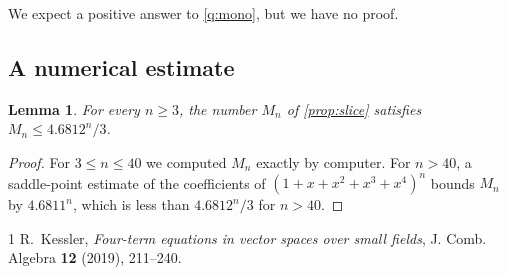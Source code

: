 \documentclass[11pt]{amsart}
\newtheorem{lem}[lem]{Lemma}
\theoremstyle{definition}
\numberwithin{equation}{section}
\begin{document}
We expect a positive answer to \cref{q:mono}, but we have no proof.

\begin{appendix}
\section{A numerical estimate}\label{app:numeric}

\begin{lem}\label{lem:numeric}
For every $n \geq 3$, the number $M_n$ of \cref{prop:slice} satisfies $M_n \leq 4.6812^n / 3$.
\end{lem}

\begin{proof}
For $3 \leq n \leq 40$ we computed $M_n$ exactly by computer. For $n > 40$, a saddle-point estimate of the coefficients of $(1 + x + x^2 + x^3 + x^4)^n$ bounds $M_n$ by $4.6811^n$, which is less than $4.6812^n/3$ for $n > 40$.
\end{proof}
\end{appendix}

\begin{thebibliography}{1}
 R.~Kessler, \emph{Four-term equations in vector spaces over small fields}, J. Comb. Algebra \textbf{12} (2019), 211--240.
\end{thebibliography}
\end{document}
